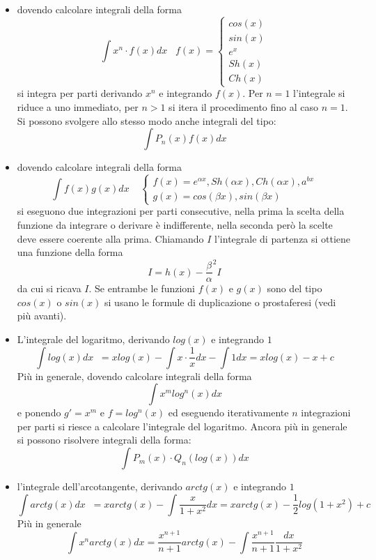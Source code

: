 \documentclass[a4paper, 9pt]{report}
\begin{document}
\begin{itemize}
    \item dovendo calcolare integrali della forma
    \[
        \int x^n \cdot f(x) dx \;\;\; f(x) = \begin{cases}
            cos(x)\\ 
            sin(x)\\ 
            e^x\\ 
            Sh(x)\\ 
            Ch(x)        
        \end{cases}
    \]
    si integra per parti derivando $x^n$ e integrando $f(x)$. Per $n=1$ l'integrale si riduce a uno immediato, per $n>1$ si itera il procedimento fino al caso $n=1$. Si possono svolgere allo stesso modo anche integrali del tipo:
    \[
        \int P_n(x) f(x) dx
    \]
    \item dovendo calcolare integrali della forma
    \[
        \int f(x) g(x) dx \;\;\;\; \begin{cases}
            f(x) = e^{\alpha x}, Sh(\alpha x), Ch( \alpha x), a^{bx} \\
            g(x) = cos( \beta x), sin(\beta x)
        \end{cases}
    \]
    si eseguono due integrazioni per parti consecutive, nella prima la scelta della funzione da integrare o derivare è indifferente, nella seconda però la scelte deve essere coerente alla prima. Chiamando $I$ l'integrale di partenza si ottiene una funzione della forma
    \[
        I = h(x) - \frac{\beta}{\alpha}^2 I
    \]
    da cui si ricava $I$.\newline
    Se entrambe le funzioni $f(x)$ e $g(x)$ sono del tipo $cos(x)$ o $sin(x)$ si usano le formule di duplicazione o prostaferesi (vedi più avanti).
    \item L'integrale del logaritmo, derivando $log(x)$ e integrando $1$
    \[
        \int log(x) dx \;\; = xlog(x) - \int x \cdot  \frac{1}{x} dx - \int 1 dx = x log(x) -x + c
    \]
    Più in generale, dovendo calcolare integrali della forma
    \[
        \int x^m log^n(x) dx
    \]
    e ponendo $g' = x^m$ e $f = log^n(x)$ ed eseguendo iterativamente $n$ integrazioni per parti si riesce a calcolare l'integrale del logaritmo. Ancora più in generale si possono risolvere integrali della forma:
    \[
        \int P_m(x) \cdot Q_n(log(x)) dx 
    \]
    \item l'integrale dell'arcotangente, derivando $arctg(x)$ e integrando $1$
    \[
        \int arctg (x) dx \;\; = x arctg(x) -\int \frac{x}{1+x^2}dx = x arctg(x) -\frac{1}{2}log(1+x^2) + c 
    \]
    Più in generale
    \[
        \int x^n arctg(x) dx  = \frac{x^{n+1}}{n+1}arctg(x) - \int\frac{x^{n+1}}{n+1} \frac{dx}{1+x^2}
    \]
\end{itemize}
\end{document}
